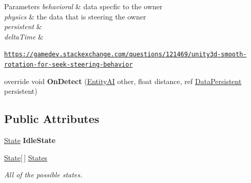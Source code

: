 \begin{DoxyCompactItemize}
\begin{DoxyCompactList}
\begin{DoxyParams}{Parameters}
{\em behavioral} & data specfic to the owner\\
\hline
{\em physics} & the data that is steering the owner\\
\hline
{\em persistent} & \\
\hline
{\em delta\-Time} & \\
\hline
\end{DoxyParams}
 \href{https://gamedev.stackexchange.com/questions/121469/unity3d-smooth-rotation-for-seek-steering-behavior}{\tt https\-://gamedev.\-stackexchange.\-com/questions/121469/unity3d-\/smooth-\/rotation-\/for-\/seek-\/steering-\/behavior}  \end{DoxyCompactList}\item 
\hypertarget{class_skyrates_1_1_a_i_1_1_state_1_1_state_machine_af4d282ef6ac4ca72e5fcf8b612277730}{override void {\bfseries On\-Detect} (\hyperlink{class_skyrates_1_1_entity_1_1_entity_a_i}{Entity\-A\-I} other, float distance, ref \hyperlink{class_skyrates_1_1_a_i_1_1_behavior_1_1_data_persistent}{Data\-Persistent} persistent)}\label{class_skyrates_1_1_a_i_1_1_state_1_1_state_machine_af4d282ef6ac4ca72e5fcf8b612277730}

\end{DoxyCompactItemize}
\subsection*{Public Attributes}
\begin{DoxyCompactItemize}
\item 
\hypertarget{class_skyrates_1_1_a_i_1_1_state_1_1_state_machine_a056f4fcc07c57a0d967bf61424e0b085}{\hyperlink{class_skyrates_1_1_a_i_1_1_state_1_1_state}{State} {\bfseries Idle\-State}}\label{class_skyrates_1_1_a_i_1_1_state_1_1_state_machine_a056f4fcc07c57a0d967bf61424e0b085}

\item 
\hyperlink{class_skyrates_1_1_a_i_1_1_state_1_1_state}{State}\mbox{[}$\,$\mbox{]} \hyperlink{class_skyrates_1_1_a_i_1_1_state_1_1_state_machine_a892016093699b67b71a2f69c5fb6443f}{States}
\begin{DoxyCompactList}\small\item\em All of the possible states. \end{DoxyCompactList}\end{DoxyCompactItemize}

